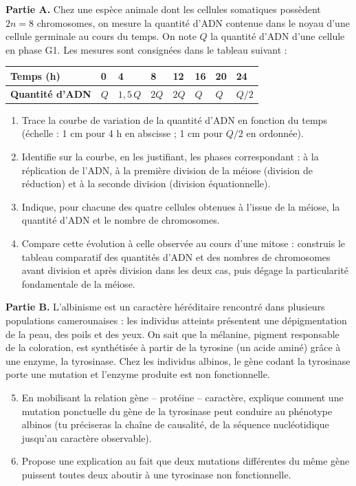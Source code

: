 \documentclass[11pt]{article}
\begin{document}
\begin{exercice}
\textbf{Partie A.} Chez une espèce animale dont les cellules somatiques possèdent $2n = 8$ chromosomes, on mesure la quantité d'ADN contenue dans le noyau d'une cellule germinale au cours du temps. On note $Q$ la quantité d'ADN d'une cellule en phase G1. Les mesures sont consignées dans le tableau suivant :

\begin{center}
\begin{tabularx}{\linewidth}{|l|X|X|X|X|X|X|X|}
\hline
\rowcolor{popblueL}
\textbf{Temps (h)} & 0 & 4 & 8 & 12 & 16 & 20 & 24 \\
\hline
\textbf{Quantité d'ADN} & $Q$ & $1{,}5\,Q$ & $2Q$ & $2Q$ & $Q$ & $Q$ & $Q/2$ \\
\hline
\end{tabularx}
\end{center}

\begin{enumerate}
\item Trace la courbe de variation de la quantité d'ADN en fonction du temps (échelle : 1 cm pour 4 h en abscisse ; 1 cm pour $Q/2$ en ordonnée).
\item Identifie sur la courbe, en les justifiant, les phases correspondant : à la réplication de l'ADN, à la première division de la méiose (division de réduction) et à la seconde division (division équationnelle).
\item Indique, pour chacune des quatre cellules obtenues à l'issue de la méiose, la quantité d'ADN et le nombre de chromosomes.
\item Compare cette évolution à celle observée au cours d'une mitose : construis le tableau comparatif des quantités d'ADN et des nombres de chromosomes avant division et après division dans les deux cas, puis dégage la particularité fondamentale de la méiose.
\end{enumerate}

\textbf{Partie B.} L'albinisme est un caractère héréditaire rencontré dans plusieurs populations camerounaises : les individus atteints présentent une dépigmentation de la peau, des poils et des yeux. On sait que la mélanine, pigment responsable de la coloration, est synthétisée à partir de la tyrosine (un acide aminé) grâce à une enzyme, la tyrosinase. Chez les individus albinos, le gène codant la tyrosinase porte une mutation et l'enzyme produite est non fonctionnelle.

\begin{enumerate}
\setcounter{enumi}{4}
\item En mobilisant la relation gène -- protéine -- caractère, explique comment une mutation ponctuelle du gène de la tyrosinase peut conduire au phénotype albinos (tu préciseras la chaîne de causalité, de la séquence nucléotidique jusqu'au caractère observable).
\item Propose une explication au fait que deux mutations différentes du même gène puissent toutes deux aboutir à une tyrosinase non fonctionnelle.
\end{enumerate}
\end{exercice}
\end{document}
